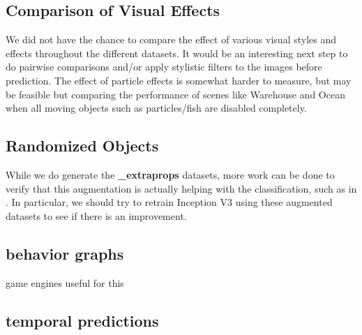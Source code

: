 \subsection{Comparison of Visual Effects}
We did not have the chance to compare the effect of various visual styles and effects throughout the different datasets. It would be an interesting next step to do pairwise comparisons and/or apply stylistic filters to the images before prediction. The effect of particle effects is somewhat harder to measure, but may be feasible but comparing the performance of scenes like Warehouse and Ocean when all moving objects such as particles/fish are disabled completely.
\subsection{Randomized Objects}
While we do generate the \textbf{\_extraprops} datasets, more work can be done to verify that this augmentation is actually helping with the classification, such as in \cite{chabra2020deep}. In particular, we should try to retrain Inception V3 using these augmented datasets to see if there is an improvement.
\subsection{behavior graphs}
game engines useful for this
\subsection{temporal predictions}